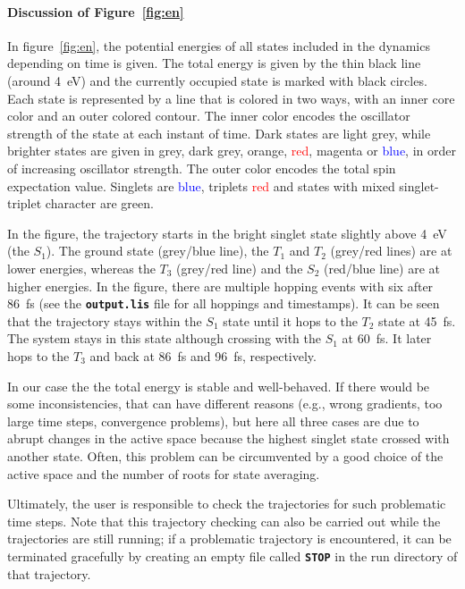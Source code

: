 \documentclass[a4paper,11pt,DIV=15,openany]{scrbook}
\newcommand{\ttt}[1]{\textbf{\texttt{#1}}}
\begin{document}
\paragraph{Discussion of Figure~\ref{fig:en}}

In figure~\ref{fig:en}, the potential energies of all states included in the dynamics depending on time is given. 
The total energy is given by the thin black line (around 4~eV) and the currently occupied state is marked with black circles. 
Each state is represented by a line that is colored in two ways, with an inner core color and an outer colored contour.
The inner color encodes the oscillator strength of the state at each instant of time. 
Dark states are \textcolor{black!20}{light grey}, while brighter states are given in \textcolor{black!40}{grey}, \textcolor{black!70}{dark grey}, \textcolor{red!60!green}{orange}, \textcolor{red}{red}, \textcolor{red!50!blue}{magenta} or \textcolor{blue}{blue}, in order of increasing oscillator strength. 
The outer color encodes the total spin expectation value. 
Singlets are \textcolor{blue}{blue}, triplets \textcolor{red}{red} and states with mixed singlet-triplet character are \textcolor{green!90!black}{green}. 

In the figure, the trajectory starts in the bright singlet state slightly above 4~eV (the $S_1$).
The ground state (grey/blue line), the $T_1$ and $T_2$ (grey/red lines) are at lower energies, whereas the $T_3$ (grey/red line) and the $S_2$ (red/blue line) are at higher energies.
In the figure, there are multiple hopping events with six after 86~fs (see the \ttt{output.lis} file for all hoppings and timestamps).
It can be seen that the trajectory stays within the $S_1$ state until it hops to the $T_2$ state at 45~fs. 
The system stays in this state although crossing with the $S_1$ at 60~fs. It later hops to the $T_3$ and back at 86~fs and 96~fs, respectively.

In our case the the total energy is stable and well-behaved. If there would be some inconsistencies, that can have different reasons (e.g., wrong gradients, too large time steps, convergence problems), but here all three cases are due to abrupt changes in the active space because the highest singlet state crossed with another state.
Often, this problem can be circumvented by a good choice of the active space and the number of roots for state averaging.

Ultimately, the user is responsible to check the trajectories for such problematic time steps.
Note that this trajectory checking can also be carried out while the trajectories are still running; if a problematic trajectory is encountered, it can be terminated gracefully by creating an empty file called \ttt{STOP} in the run directory of that trajectory.
\end{document}
